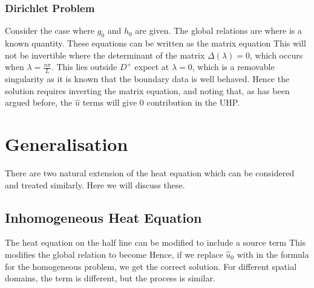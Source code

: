 \documentclass{article}
\begin{document}
\subsubsection{Dirichlet Problem}
Consider the case where $g_0$ and $h_0$ are given. The global relations are 
where 
is a known quantity. These equations can be written as the matrix equation 
This will not be invertible where the determinant of the matrix $\Delta(\lambda) = 0$, which occurs when $\lambda = \frac{n\pi}{L}$. This lies outside $D^+$ expect at $\lambda = 0$, which is a removable singularity as it is known that the boundary data is well behaved. Hence the solution requires inverting the matrix equation, and noting that, as has been argued before, the $\hat{u}$ terms will give 0 contribution in the UHP. 

\section{Generalisation}
There are two natural extension of the heat equation which can be considered and treated similarly. Here we will discuss these. 

\subsection{Inhomogeneous Heat Equation}
The heat equation on the half line can be modified to include a source term 
This modifies the global relation to become 
Hence, if we replace $\hat{u}_0$ with  
in the formula for the homogeneous problem, we get the correct solution. For different spatial domains, the term is different, but the process is similar. 
\end{document}
